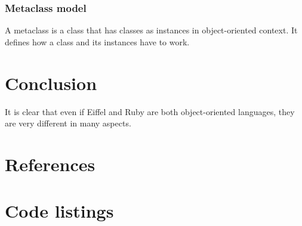\documentclass[12pt,a4paper,twocolumn]{article}
\begin{document}
\subsubsection{Metaclass model}
\label{sec:metaclass}
A metaclass is a class that has classes as instances in object-oriented context. It defines how a class and its instances have to work.

\section{Conclusion}
It is clear that even if Eiffel and Ruby are both object-oriented languages, they are very different in many aspects.
\section{References}


\newpage
\section{Code listings}













\end{document}
